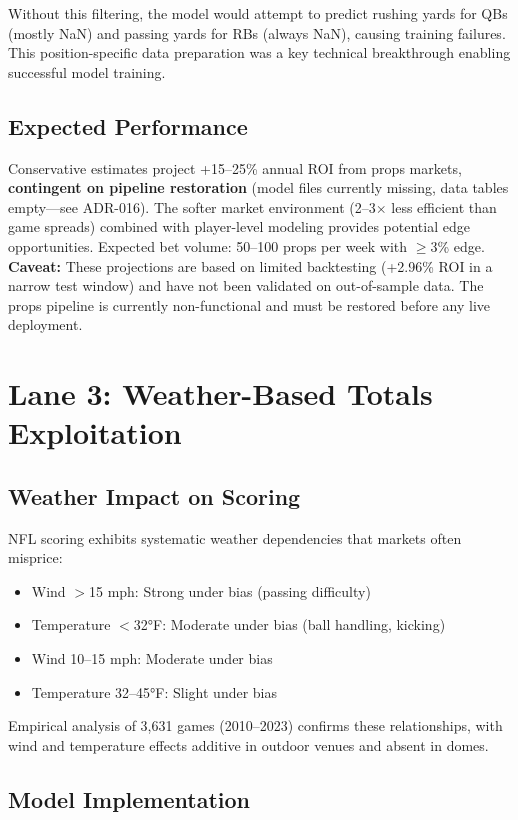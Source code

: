 Without this filtering, the model would attempt to predict rushing yards for QBs (mostly NaN) and passing yards for RBs (always NaN), causing training failures. This position-specific data preparation was a key technical breakthrough enabling successful model training.

\subsection{Expected Performance}

Conservative estimates project +15--25\% annual ROI from props markets, \textbf{contingent on pipeline restoration} (model files currently missing, data tables empty---see ADR-016). The softer market environment (2--3$\times$ less efficient than game spreads) combined with player-level modeling provides potential edge opportunities. Expected bet volume: 50--100 props per week with $\geq$3\% edge. \textbf{Caveat:} These projections are based on limited backtesting (+2.96\% ROI in a narrow test window) and have not been validated on out-of-sample data. The props pipeline is currently non-functional and must be restored before any live deployment.

\section{Lane 3: Weather-Based Totals Exploitation}

\subsection{Weather Impact on Scoring}

NFL scoring exhibits systematic weather dependencies that markets often misprice:
\begin{itemize}
  \item Wind $>$15 mph: Strong under bias (passing difficulty)
  \item Temperature $<$32°F: Moderate under bias (ball handling, kicking)
  \item Wind 10--15 mph: Moderate under bias
  \item Temperature 32--45°F: Slight under bias
\end{itemize}

Empirical analysis of 3,631 games (2010--2023) confirms these relationships, with wind and temperature effects additive in outdoor venues and absent in domes.

\subsection{Model Implementation}

